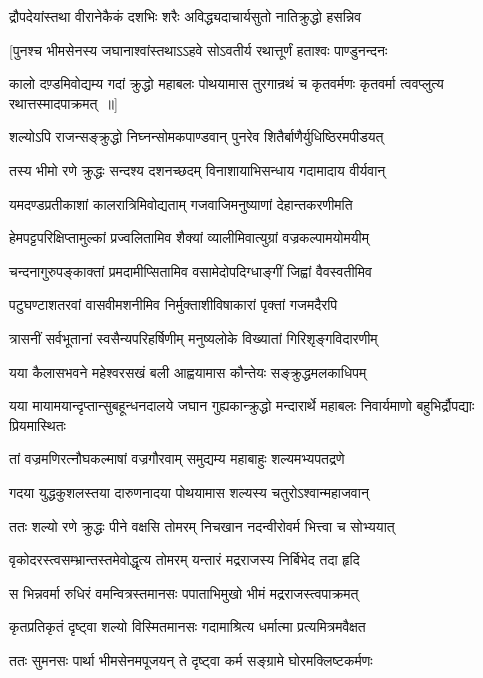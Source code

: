 \twolineshloka
{द्रौपदेयांस्तथा वीरानेकैकं दशभिः शरैः}
{अविद्ध्यदाचार्यसुतो नातिक्रुद्धो हसन्निव}


\twolineshloka
{[पुनश्च भीमसेनस्य जघानाश्वांस्तथाऽऽहवे}
{सोऽवतीर्य रथात्तूर्णं हताश्वः पाण्डुनन्दनः}


\threelineshloka
{कालो दण़्डमिवोद्यम्य गदां क्रुद्धो महाबलः}
{पोथयामास तुरगान्रथं च कृतवर्मणः}
{कृतवर्मा त्ववप्लुत्य रथात्तस्मादपाक्रमत् ॥]}


\twolineshloka
{शल्योऽपि राजन्सङ्क्रुद्धो निघ्नन्सोमकपाण्डवान्}
{पुनरेव शितैर्बाणैर्युधिष्ठिरमपीडयत्}


\twolineshloka
{तस्य भीमो रणे क्रुद्धः सन्दश्य दशनच्छदम्}
{विनाशायाभिसन्धाय गदामादाय वीर्यवान्}


\twolineshloka
{यमदण्डप्रतीकाशां कालरात्रिमिवोद्यताम्}
{गजवाजिमनुष्याणां देहान्तकरणीमति}


\twolineshloka
{हेमपट्टपरिक्षिप्तामुल्कां प्रज्वलितामिव}
{शैक्यां व्यालीमिवात्युग्रां वज्रकल्पामयोमयीम्}


\twolineshloka
{चन्दनागुरुपङ्काक्तां प्रमदामीप्सितामिव}
{वसामेदोपदिग्धाङ्गीं जिह्वां वैवस्वतीमिव}


\twolineshloka
{पटुघण्टाशतरवां वासवीमशनीमिव}
{निर्मुक्ताशीविषाकारां पृक्तां गजमदैरपि}


\twolineshloka
{त्रासनीं सर्वभूतानां स्वसैन्यपरिहर्षिणीम्}
{मनुष्यलोके विख्यातां गिरिशृङ्गविदारणीम्}


\twolineshloka
{यया कैलासभवने महेश्वरसखं बली}
{आह्वयामास कौन्तेयः सङ्क्रुद्धमलकाधिपम्}


\threelineshloka
{यया मायामयान्दृप्तान्सुबहून्धनदालये}
{जघान गुह्यकान्क्रुद्धो मन्दारार्थे महाबलः}
{निवार्यमाणो बहुभिर्द्रौपद्याः प्रियमास्थितः}


\twolineshloka
{तां वज्रमणिरत्नौघकल्माषां वज्रगौरवाम्}
{समुद्यम्य महाबाहुः शल्यमभ्यपतद्रणे}


\twolineshloka
{गदया युद्धकुशलस्तया दारुणनादया}
{पोथयामास शल्यस्य चतुरोऽश्वान्महाजवान्}


\twolineshloka
{ततः शल्यो रणे क्रुद्धः पीने वक्षसि तोमरम्}
{निचखान नदन्वीरोवर्म भित्त्वा च सोभ्ययात्}


\twolineshloka
{वृकोदरस्त्वसम्भ्रान्तस्तमेवोद्धृत्य तोमरम्}
{यन्तारं मद्रराजस्य निर्बिभेद तदा हृदि}


\twolineshloka
{स भिन्नवर्मा रुधिरं वमन्वित्रस्तमानसः}
{पपाताभिमुखो भीमं मद्रराजस्त्वपाक्रमत्}


\twolineshloka
{कृतप्रतिकृतं दृष्ट्वा शल्यो विस्मितमानसः}
{गदामाश्रित्य धर्मात्मा प्रत्यमित्रमवैक्षत}


\twolineshloka
{ततः सुमनसः पार्था भीमसेनमपूजयन्}
{ते दृष्ट्वा कर्म सङ्ग्रामे घोरमक्लिष्टकर्मणः}


